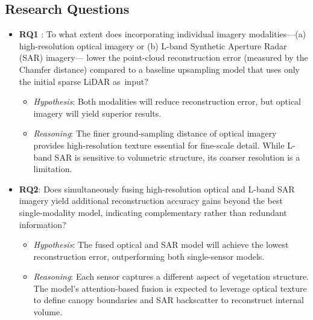 \documentclass[remotesensing,article,accept,pdftex,moreauthors]{Definitions/mdpi}
\begin{document}
\subsection{Research Questions}
\begin{itemize}
  \item \textbf{RQ1}
: To what extent does incorporating individual imagery modalities---(a) high-resolution optical imagery or (b) L-band Synthetic Aperture Radar (SAR) imagery---
lower the point-cloud reconstruction error (measured by the Chamfer distance) compared to a baseline upsampling model that uses only the initial sparse LiDAR \mbox{as input}?
        \begin{itemize}
          \item \textit{Hypothesis}: Both modalities will reduce reconstruction error, but optical imagery will yield superior results.
          \item \textit{Reasoning}: The finer ground-sampling distance of optical imagery provides high-resolution texture essential for fine-scale detail. While L-band SAR is sensitive to volumetric structure, its coarser resolution is a limitation.
        \end{itemize}

  \item \textbf{RQ2}: Does simultaneously fusing high-resolution optical and L-band SAR imagery yield additional reconstruction accuracy gains beyond the best single-modality model, indicating complementary rather than redundant information?
        \begin{itemize}
          \item \textit{Hypothesis}: The fused optical and SAR model will achieve the lowest reconstruction error, outperforming both single-sensor models.
          \item \textit{Reasoning}: Each sensor captures a different aspect of vegetation structure. The model's attention-based fusion is expected to leverage optical texture to define canopy boundaries and SAR backscatter to reconstruct internal volume.
        \end{itemize}


\end{itemize}
\end{document}
